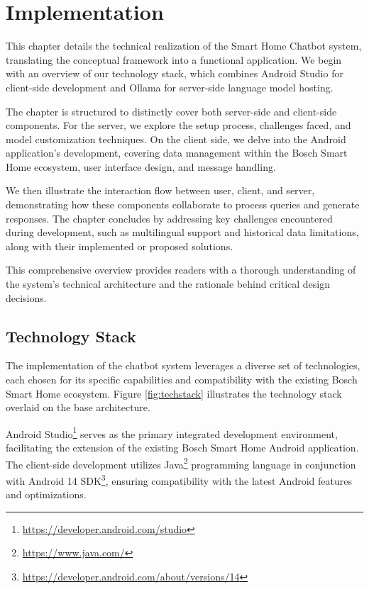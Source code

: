 \chapter{Implementation}
\label{chap:implementation}
This chapter details the technical realization of the Smart Home Chatbot system, translating the conceptual framework into a functional application. We begin with an overview of our technology stack, which combines Android Studio for client-side development and Ollama for server-side language model hosting.

The chapter is structured to distinctly cover both server-side and client-side components. For the server, we explore the setup process, challenges faced, and model customization techniques. On the client side, we delve into the Android application's development, covering data management within the Bosch Smart Home ecosystem, user interface design, and message handling.

We then illustrate the interaction flow between user, client, and server, demonstrating how these components collaborate to process queries and generate responses. The chapter concludes by addressing key challenges encountered during development, such as multilingual support and historical data limitations, along with their implemented or proposed solutions.

This comprehensive overview provides readers with a thorough understanding of the system's technical architecture and the rationale behind critical design decisions.



\section{Technology Stack}
The implementation of the chatbot system leverages a diverse set of technologies, each chosen for its specific capabilities and compatibility with the existing Bosch Smart Home ecosystem. Figure \ref{fig:techstack} illustrates the technology stack overlaid on the base architecture.

Android Studio\footnote{\url{https://developer.android.com/studio}} serves as the primary integrated development environment, facilitating the extension of the existing Bosch Smart Home Android application. The client-side development utilizes Java\footnote{\url{https://www.java.com/}} programming language in conjunction with Android 14 SDK\footnote{\url{https://developer.android.com/about/versions/14}}, ensuring compatibility with the latest Android features and optimizations.


